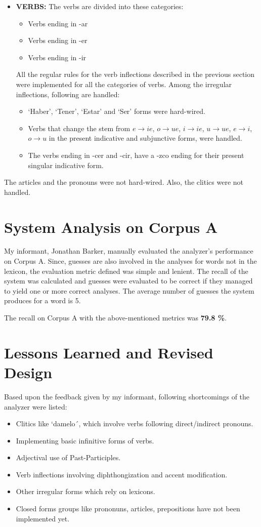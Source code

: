 \documentclass[11pt,letterpaper]{article}
\begin{document}
\begin{itemize}
\item
{\bf VERBS:} The verbs are divided into these categories:
\begin{itemize}
\item Verbs ending in -ar
\item Verbs ending in -er
\item Verbs ending in -ir
\end{itemize}
All the regular rules for the verb inflections described in the previous section were implemented for all the categories of verbs. Among the irregular inflections, following are handled:
\begin{itemize}
\item `Haber', `Tener', `Estar' and `Ser' forms were hard-wired.
\item Verbs that change the stem from $e \rightarrow ie$, $o \rightarrow ue$, $i \rightarrow ie$, $u \rightarrow ue$, $e \rightarrow i$, $o \rightarrow u$  in the present indicative and subjunctive forms, were handled. 
\item The verbs ending in -cer and -cir, have a -zco ending for their present singular indicative form.
\end{itemize}

\end{itemize}

The articles and the pronouns were not hard-wired. Also, the clitics were not handled.
\section{System Analysis on Corpus A}
My informant, Jonathan Barker, manually evaluated the analyzer's performance on Corpus A. Since, guesses are also involved in the analyses for words not in the lexicon, the evaluation metric defined was simple and lenient. The recall of the system was calculated and guesses were evaluated to be correct if they managed to yield one or more correct analyses. The average number of guesses the system produces for a word is 5.

\vspace{5mm}

The recall on Corpus A with the above-mentioned metrics was {\bf 79.8 \%}. 


\section{Lessons Learned and Revised Design}
Based upon the feedback given by my informant, following shortcomings of the analyzer were listed:
\begin{itemize}
\item Clitics like `damelo´, which involve verbs following direct/indirect pronouns.  
\item Implementing basic infinitive forms of verbs.
\item Adjectival use of Past-Participles.
\item Verb inflections involving diphthongization and accent modification. 
\item Other irregular forms which rely on lexicons.
\item Closed forms groups like prononuns, articles, prepositions have not been implemented yet.
\end{itemize}
\end{document}
